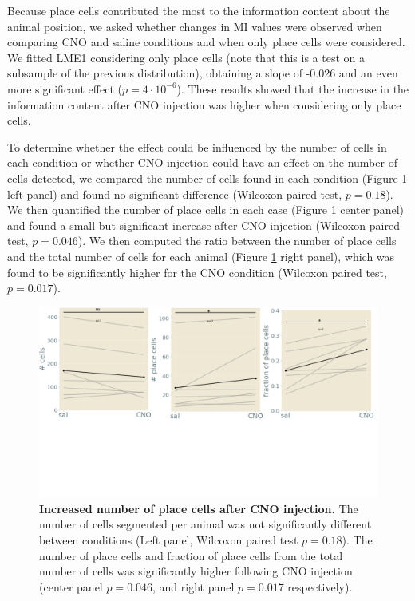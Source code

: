 Because place cells contributed the most to the information content about the animal position, we asked whether changes in MI values were observed when comparing CNO and saline conditions and when only place cells were considered. 
We fitted LME1 considering only place cells (note that this is a test on a subsample of the previous distribution), obtaining a slope of -0.026 and an even more significant effect ($p=4 \cdot 10^{-6}$).
These results showed that the increase in the information content after CNO injection was higher when considering only place cells. 

To determine whether the effect could be influenced by the number of cells in each condition or whether CNO injection could have an effect on the number of cells detected, we compared the number of cells found in each condition (Figure \ref{fig:chap4:pc_quantification_2p} left panel) and found no significant difference (Wilcoxon paired test, $p=0.18$). 
We then quantified the number of place cells in each case (Figure \ref{fig:chap4:pc_quantification_2p} center panel) and found a small but significant increase after CNO injection (Wilcoxon paired test, $p=0.046$).
We then computed the ratio between the number of place cells and the total number of cells for each animal (Figure \ref{fig:chap4:pc_quantification_2p} right panel), which was found to be significantly higher for the CNO condition (Wilcoxon paired test, $p=0.017$).
\begin{figure}
    \centering
    \includegraphics[trim={0 200 0 0},clip,width=\textwidth]{Figures/Chapter4/pc_quantification_2p.pdf}
    \caption[Increased number of place cells after CNO injection.]{\textbf{Increased number of place cells after CNO injection.} 
    The number of cells segmented per animal was not significantly different between conditions (Left panel, Wilcoxon paired test $p = 0.18$). 
    The number of place cells and fraction of place cells from the total number of cells was significantly higher following CNO injection (center panel $p=0.046$, and right panel $p=0.017$ respectively).}
    \label{fig:chap4:pc_quantification_2p}
\end{figure}

